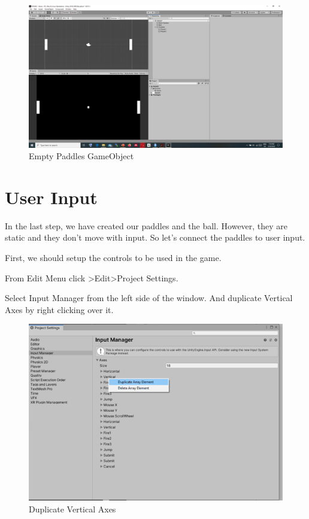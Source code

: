 \documentclass[
]{book}
\begin{document}
\begin{figure}
\centering
\includegraphics{Images/Paddles.png}
\caption{Empty Paddles GameObject}
\end{figure}

\hypertarget{user-input}{%
\section{User Input}\label{user-input}}

In the last step, we have created our paddles and the ball. However, they are static and they don't move with input. So let's connect the paddles to user input.

First, we should setup the controls to be used in the game.

From Edit Menu click \textgreater Edit\textgreater Project Settings.

Select Input Manager from the left side of the window. And duplicate Vertical Axes by right clicking over it.

\begin{figure}
\centering
\includegraphics{Images/InputManager.png}
\caption{Duplicate Vertical Axes}
\end{figure}
\end{document}
